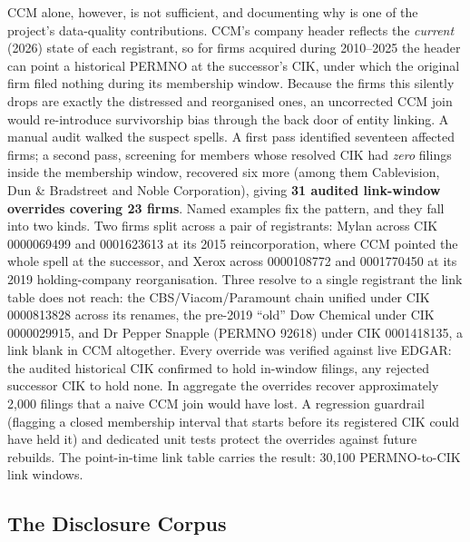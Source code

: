 CCM alone, however, is not sufficient, and documenting why is one of the project's data-quality contributions. CCM's company header reflects the \emph{current} (2026) state of each registrant, so for firms acquired during 2010--2025 the header can point a historical PERMNO at the successor's CIK, under which the original firm filed nothing during its membership window. Because the firms this silently drops are exactly the distressed and reorganised ones, an uncorrected CCM join would re-introduce survivorship bias through the back door of entity linking. A manual audit walked the suspect spells. A first pass identified seventeen affected firms; a second pass, screening for members whose resolved CIK had \emph{zero} filings inside the membership window, recovered six more (among them Cablevision, Dun \& Bradstreet and Noble Corporation), giving \textbf{31 audited link-window overrides covering 23 firms}. %
Named examples fix the pattern, and they fall into two kinds. Two firms split across a pair of registrants: Mylan across CIK 0000069499 and 0001623613 at its 2015 reincorporation, where CCM pointed the whole spell at the successor, and Xerox across 0000108772 and 0001770450 at its 2019 holding-company reorganisation. Three resolve to a single registrant the link table does not reach: the CBS/Viacom/Paramount chain unified under CIK 0000813828 across its renames, the pre-2019 ``old'' Dow Chemical under CIK 0000029915, and Dr Pepper Snapple (PERMNO 92618) under CIK 0001418135, a link blank in CCM altogether. %
Every override was verified against live EDGAR: the audited historical CIK confirmed to hold in-window filings, any rejected successor CIK to hold none. In aggregate the overrides recover approximately 2{,}000 filings that a naive CCM join would have lost. %
A regression guardrail (flagging a closed membership interval that starts before its registered CIK could have held it) and dedicated unit tests protect the overrides against future rebuilds. The point-in-time link table carries the result: 30{,}100 PERMNO-to-CIK link windows. %

\subsection{The Disclosure Corpus}
\label{sec:data-corpus}

